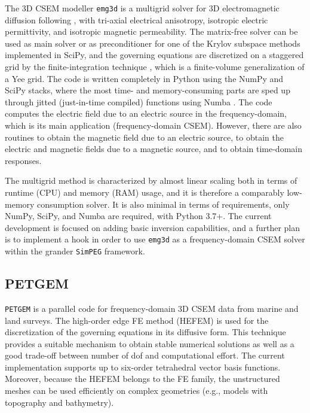 \documentclass[
    paper,
  ]{geophysics}
\newcommand{\emg}[2]{\texttt{emg#1#2}\xspace}
\newcommand{\simpeg}{\texttt{SimPEG}\xspace}
\newcommand{\petgem}{\texttt{PETGEM}\xspace}
\newcommand{\mycom}[2][]{\todo{\textbf{\uppercase{[#1]}}:~#2}}
\begin{document}
The 3D CSEM modeller \emg3d is a multigrid \citep{CMMP.64.Fedorenko} solver for
3D electromagnetic diffusion following \cite{GP.06.Mulder}, with tri-axial
electrical anisotropy, isotropic electric permittivity, and isotropic magnetic
permeability. The matrix-free solver can be used as main solver or as
preconditioner for one of the Krylov subspace methods implemented in SciPy, and
the governing equations are discretized on a staggered grid by the
finite-integration technique \citep{AEU.77.Weiland}, which is a finite-volume
generalization of a Yee grid. The code is written completely in Python using
the NumPy and SciPy stacks, where the most time- and memory-consuming parts are
sped up through jitted (just-in-time compiled) functions using Numba
\citep{LLVM.15.Lam}. The code computes the electric field due to an electric
source in the frequency-domain, which is its main application (frequency-domain
CSEM). However, there are also routines to obtain the magnetic field due to an
electric source, to obtain the electric and magnetic fields due to a magnetic
source, and to obtain time-domain responses.

The multigrid method is characterized by almost linear scaling both in terms of
runtime (CPU) and memory (RAM) usage, and it is therefore a comparably
low-memory consumption solver. It is also minimal in terms of requirements,
only NumPy, SciPy, and Numba are required, with Python 3.7+. The current
development is focused on adding basic inversion capabilities, and a further
plan is to implement a hook in order to use \emg3d as a frequency-domain CSEM
solver within the grander \simpeg framework.

\subsection{PETGEM}

\petgem is a parallel code for frequency-domain 3D CSEM data from marine and
land surveys. The high-order edge FE method (HEFEM) is used for the
discretization of the governing equations in its diffusive form. This technique
provides a suitable mechanism to obtain stable numerical solutions as well as a
good trade-off between number of dof\mycom[OCR]{I assume we have previously
mentioned the term dofs} and computational effort. The current implementation
supports up to six-order tetrahedral vector basis functions. Moreover, because
the HEFEM belongs to the FE family, the unstructured meshes can be used
efficiently on complex geometries (e.g., models with topography and
bathymetry).
\end{document}
